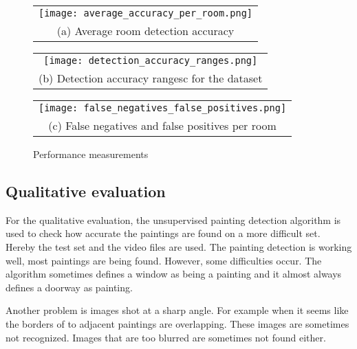 \begin{figure}
    \centering
    \begin{tabular}{@{}c@{}}
        \texttt{[image: average\_accuracy\_per\_room.png]} \\[\abovecaptionskip]
        \small (a) Average room detection accuracy
    \end{tabular}

    \vspace{\floatsep}

    \begin{tabular}{@{}c@{}}
        \texttt{[image: detection\_accuracy\_ranges.png]} \\[\abovecaptionskip]
        \small (b) Detection accuracy rangesc for the dataset
    \end{tabular}

    \begin{tabular}{@{}c@{}}
        \texttt{[image: false\_negatives\_false\_positives.png]} \\[\abovecaptionskip]
        \small (c) False negatives and false positives per room
    \end{tabular}

    \caption{Performance measurements}
    \label{fig:performance-measurements}
\end{figure}

\subsection{Qualitative evaluation}
For the qualitative evaluation, the unsupervised painting detection algorithm is used to check how accurate the paintings are found on a more difficult set. Hereby the test set and the video files are used. The painting detection is working well, most paintings are being found. However, some difficulties occur. The algorithm sometimes defines a window as being a painting and it almost always defines a doorway as painting.

Another problem is images shot at a sharp angle. For example when it seems like the borders of to adjacent paintings are overlapping. These images are sometimes not recognized. Images that are too blurred are sometimes not found either.
